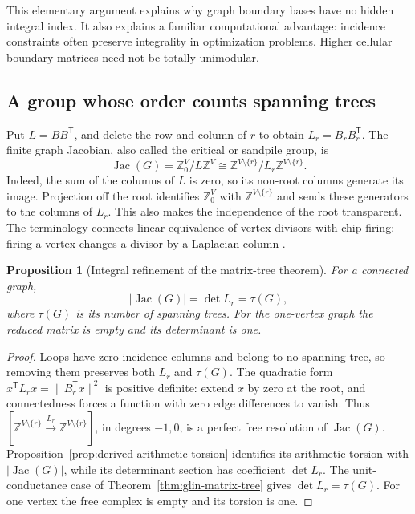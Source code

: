 \documentclass[11pt]{article}
\newtheorem{proposition}[theorem]{Proposition}
\theoremstyle{definition}
\theoremstyle{remark}
\newcommand{\Z}{\mathbb Z}
\begin{document}
This elementary argument explains why graph boundary bases have no hidden
integral index.  It also explains a familiar computational advantage:
incidence constraints often preserve integrality in optimization problems.
Higher cellular boundary matrices need not be totally unimodular.

\subsection{A group whose order counts spanning trees}

Put \(L=BB^{\mathsf T}\), and delete the row and column of \(r\) to obtain
\(L_r=B_rB_r^{\mathsf T}\).  The finite graph Jacobian, also called the
critical or sandpile group, is
\[
 \operatorname{Jac}(G)=\Z^V_0/L\Z^V
       \cong\Z^{V\setminus\{r\}}/L_r\Z^{V\setminus\{r\}}.
\]
Indeed, the sum of the columns of \(L\) is zero, so its non-root columns
generate its image.  Projection off the root identifies \(\Z^V_0\) with
\(\Z^{V\setminus\{r\}}\) and sends these generators to the columns of
\(L_r\).  This also makes the independence of the root transparent.
The terminology connects linear equivalence of vertex divisors with
chip-firing: firing a vertex changes a divisor by a Laplacian column
\cite{gih-levine-tree}.

\begin{proposition}[Integral refinement of the matrix-tree theorem]
For a connected graph,
\[
 |\operatorname{Jac}(G)|=\det L_r=\tau(G),
\]
where \(\tau(G)\) is its number of spanning trees.  For the one-vertex
graph the reduced matrix is empty and its determinant is one.
\end{proposition}
\begin{proof}
Loops have zero incidence columns and belong to no spanning tree, so
removing them preserves both $L_r$ and $\tau(G)$.
The quadratic form $x^{\mathsf T}L_rx=\|B_r^{\mathsf T}x\|^2$ is positive
definite: extend $x$ by zero at the root, and connectedness forces a
function with zero edge differences to vanish. Thus
$[\Z^{V\setminus\{r\}}\xrightarrow{L_r}\Z^{V\setminus\{r\}}]$, in degrees
$-1,0$, is a perfect free resolution of $\operatorname{Jac}(G)$.
Proposition~\ref{prop:derived-arithmetic-torsion} identifies its arithmetic
torsion with $|\operatorname{Jac}(G)|$, while its determinant section has
coefficient $\det L_r$. The unit-conductance case of
Theorem~\ref{thm:glin-matrix-tree} gives $\det L_r=\tau(G)$.
For one vertex the free complex is empty and its torsion is one.
\end{proof}
\end{document}
